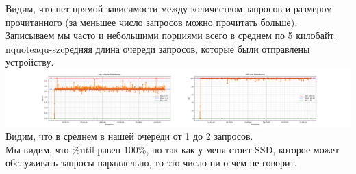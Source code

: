 Видим, что нет прямой зависимости между количеством запросов и размером прочитанного (за меньшее число запросов можно прочитать больше).\\
Записываем мы часто и небольшими порциями всего в среднем по 5 килобайт.\\
nquote{aqu-sz}{cредняя длина очереди запросов, которые были отправлены устройству.}
\includegraphics[width=\textwidth]{./io/image/io-uring_7.png}
Видим, что в среднем в нашей очереди от 1 до 2 запросов. \\
Мы видим, что \%util равен 100\%, но так как у меня стоит SSD, которое может обслуживать запросы параллельно, то это число ни о чем не говорит. \\

